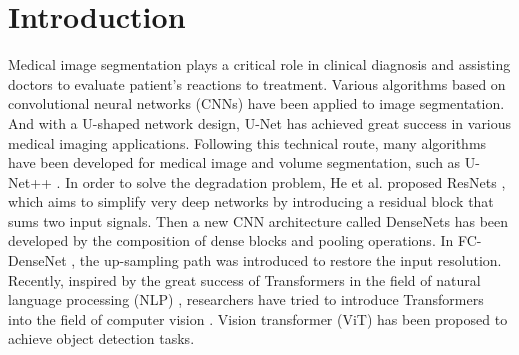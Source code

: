 \documentclass[runningheads]{llncs}
\begin{document}
\section{Introduction}
\label{sec1}
Medical image segmentation plays a critical role in clinical diagnosis and assisting doctors to evaluate patient’s reactions to treatment. Various algorithms based on convolutional neural networks (CNNs) \cite{lecun1998gradient} have been applied to image segmentation. And with a U-shaped network design, U-Net \cite{ronneberger2015u} has achieved great success in various medical imaging applications. Following this technical route, many algorithms have been developed for medical image and volume segmentation, such as U-Net++ \cite{zhou2018unet++}. In order to solve the degradation problem, He et al. proposed ResNets \cite{he2016identity}, which aims to simplify very deep networks by introducing a residual block that sums two input signals. Then a new CNN architecture called DenseNets  \cite{iandola2014densenet} has been developed by the composition of dense blocks and pooling operations. In FC-DenseNet \cite{zhang2018automatic}, the up-sampling path was introduced to restore the input resolution. Recently, inspired by the great success of Transformers in the field of natural language processing (NLP) \cite{chowdhury2003natural}, researchers have tried to introduce Transformers into the field of computer vision \cite{li2022lvit,zhou2021deepvit}. Vision transformer (ViT) \cite{dosovitskiy2020image} has been proposed to achieve object detection tasks.
\end{document}
